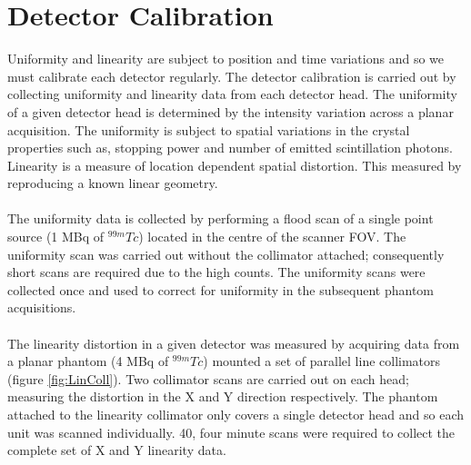 \section{Detector Calibration}
Uniformity and linearity are subject to position and time variations and so we must calibrate each detector regularly. The detector calibration is carried out by collecting uniformity and linearity data from each detector head. The uniformity of a given detector head is determined by the intensity variation across a planar acquisition. The uniformity is subject to spatial variations in the crystal properties such as, stopping power and number of emitted scintillation photons. Linearity is a measure of location dependent spatial distortion. This measured by reproducing a known linear geometry.
\paragraph{}
The uniformity data is collected by performing a flood scan of a single point source (1 MBq of $^{99m}Tc$) located in the centre of the scanner \acrshort{FOV}. The uniformity scan was carried out without the collimator attached; consequently short scans are required due to the high counts. The uniformity scans were collected once and used to correct for uniformity in the subsequent phantom acquisitions. 
\paragraph{}
The linearity distortion in a given detector was measured by acquiring data from a planar phantom (4 MBq of $^{99m}Tc$) mounted a set of parallel line collimators (figure \ref{fig:LinColl}). Two collimator scans are carried out on each head; measuring the distortion in the X and Y direction respectively. The phantom attached to the linearity collimator only covers a single detector head and so each unit was scanned individually. 40, four minute scans were required to collect the complete set of X and Y linearity data. 

